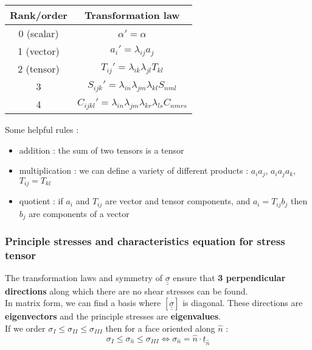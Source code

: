 \documentclass[../main.tex]{subfiles}
\begin{document}
\begin{table}[hbt!]
    \centering
    \begin{tabular}{c|c}
        Rank/order & Transformation law \\
        \hline
        0 (scalar) & $\alpha'=\alpha$\\
        1 (vector) & $a_i' = \lambda_{ij} a_j$\\
        2 (tensor) & $T_{ij}' = \lambda_{ik} \lambda_{jl} T_{kl}$\\
        3 & $S_{ijk}' = \lambda_{in} \lambda_{jm} \lambda_{kl} S_{nml}$\\
        4 & $C_{ijkl}' = \lambda_{in} \lambda_{jm} \lambda_{kr} \lambda_{ls} C_{nmrs}$\\
    \end{tabular}
\end{table}
\color{gray}Some helpful rules : \begin{itemize}
    \item addition : the sum of two tensors is a tensor\\
    \item multiplication : we can define a variety of different products : $a_i a_j$, $a_i a_j a_k$, $T_{ij} = T_{kl}$\\
    \item quotient : if $a_i$ and $T_{ij}$ are vector and tensor components, and $a_i = T_{ij} b_j$ then $b_j$ are components of a vector\\
\end{itemize} \color{black}

\subsubsection{Principle stresses and characteristics equation for stress tensor}
The transformation laws and symmetry of $\underline{\underline{\sigma}}$ ensure that \textbf{3 perpendicular directions} along which there are no shear stresses can be found.\\
In matrix form, we can find a basis where $[\underline{\underline{\sigma}}]$ is diagonal. These directions are \textbf{eigenvectors} and the principle stresses are \textbf{eigenvalues}.\\
If we order $\sigma_I \leq \sigma_{II} \leq \sigma_{III}$ then for a face oriented along $\hat{n}$ : \\
\begin{equation}
    \sigma_I \leq \sigma_{\hat{n}} \leq \sigma_{III} \Leftrightarrow \sigma_{\hat{n}} = \hat{n}\cdot \underline{t}_{\hat{n}}
\end{equation}
\end{document}
